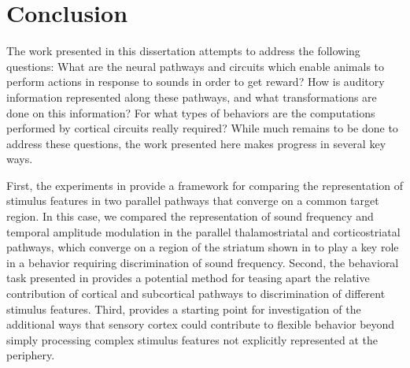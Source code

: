 \chapter{Conclusion}


The work presented in this dissertation attempts to address the following questions: 
%
What are the neural pathways and circuits which enable animals to perform actions in response to sounds in order to get reward? 
%
How is auditory information represented along these pathways, and what transformations are done on this information?
%
For what types of behaviors are the computations performed by cortical circuits really required?
%
While much remains to be done to address these questions, the work presented here makes progress in several key ways. 
%

First, the experiments in \ch{\Thstr} provide a framework for comparing the representation of stimulus features in two parallel pathways that converge on a common target region. 
%
In this case, we compared the representation of sound frequency and temporal amplitude modulation in the parallel thalamostriatal and corticostriatal pathways, which converge on a region of the striatum shown in \ch{\Musc} to play a key role in a behavior requiring discrimination of sound frequency. 
%
Second, the behavioral task presented in \ch{\Amod} provides a potential method for teasing apart the relative contribution of cortical and subcortical pathways to discrimination of different stimulus features. 
%
Third, \ch{\Rev} provides a starting point for investigation of the additional ways that sensory cortex could contribute to flexible behavior beyond simply processing complex stimulus features not explicitly represented at the periphery.



